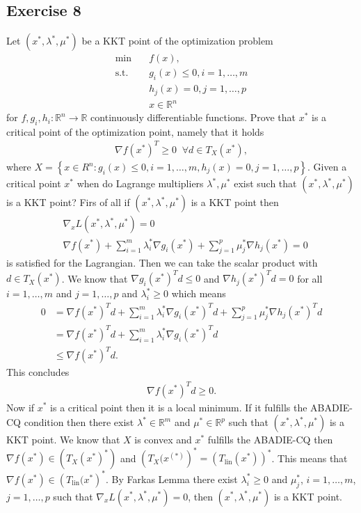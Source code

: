 \subsection{Exercise 8}
Let $(x^{*}, \lambda^{*}, \mu^{*})$ be a KKT point of the optimization
problem
\begin{align}
    \text{min}\quad & f(x),\\
    \text{s.t.}\quad & g_i(x) \le 0, i=1,\ldots,m\nonumber\\
    &h_j(x) = 0, j=1,\ldots,p\nonumber\\
    & x \in \mathbb{R}^{n}\nonumber
\end{align}
for $f, g_i, h_i:\mathbb{R}^{n}\to \mathbb{R}$ continuously differentiable
functions. Prove that $x^{*}$ is a critical point of the optimization point,
namely that it holds
\begin{align}
    \nabla f(x^{*})^{T}\ge 0 \;\; \forall d\in T_X(x^{*}),
\end{align}
where $X = \left\{ x \in R^{n}: g_i(x) \le 0, i=1,\ldots,m, h_j(x) = 0,
j=1,\ldots,p\right\}$. Given a critical point $x^{*}$ when do Lagrange
multipliers $\lambda^{*}, \mu^{*}$ exist such that $(x^{*}, \lambda^{*},
\mu^{*})$ is a KKT point?
\newline
Firs of all if $(x^{*}, \lambda^{*}, \mu^{*}) $ is a KKT point then
\begin{align}
    &\nabla_x L(x^{*},\lambda^{*}, \mu^{*}) = 0\\
    &\nabla f(x^{*}) + \sum_{i=1}^{m} \lambda_i^{*} \nabla g_i(x^{*})
    + \sum_{j=1}^{p} \mu_j^{*} \nabla h_j(x^{*}) = 0
\end{align}
is satisfied for the Lagrangian. Then we can take the scalar product with $d
\in T_X(x^{*})$. We know that $\nabla g_i(x^{*})^{T} d \le 0$ and $\nabla h_j
(x^{*})^{T}d =0$ for all $i = 1,\ldots,m$ and $j=1,\ldots,p$ and
$\lambda_i^{*}\ge 0$ which means
\begin{align}
    0 &= \nabla f(x^{*})^{T}d + \sum_{i=1}^{m} \lambda_i^{*} \nabla g_i(x^{*})^{T}d
    + \sum_{j=1}^{p} \mu^{*}_j \nabla h_j(x^{*})^{T}d \\
    &= \nabla f(x^{*})^{T}d + \sum_{i=1}^{m} \lambda_i^{*} \nabla
    g_i(x^{*})^{T}d\\
    &\le \nabla f(x^{*})^{T}d.
\end{align}
This concludes
\begin{align}
    \nabla f(x^{*})^{T}d \ge 0.
\end{align}
Now if $x^{*}$ is a critical point then it is a local minimum. If it
fulfills the ABADIE-CQ condition then there exist $\lambda^{*} \in
\mathbb{R}^{m}$ and $\mu^{*}\in\mathbb{R}^{p}$ such that $(x^{*},
\lambda^{*}, \mu^{*})$ is a KKT point. We know that $X$ is convex and $x^{*}$
fulfills the ABADIE-CQ then $\nabla f(x^{*}) \in \left( T_X(x^{*})^{*}
\right)$ and $\left( T_X(x^{(*)} \right)^{*} = (T_\text{lin}(x^{*}))^{*}$.
This means that $\nabla f(x^{*}) \in \left( T_\text{lin}(x^{*} \right)^{*}$.
By Farkas Lemma there exist $\lambda_i^{*} \ge 0$ and $\mu_j^{*}$,
$i=1,\ldots,m$, $j=1,\ldots,p$ such that $\nabla_x L(x^{*}, \lambda^{*},
\mu^{*}) = 0$, then $(x^{*}, \lambda^{*}, \mu^{*})$ is a KKT point.
